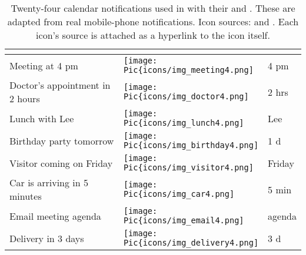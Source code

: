 \begin{table}[hptb]
  \centering
  \caption[Calendar notifications used in \studyone{}]{Twenty-four calendar notifications used in \studyone{} with their \textformat{} and \iconformat{}. These are adapted from real mobile-phone notifications. Icon sources: \materialIcons{}  and \flatIcons{}. Each icon's source is attached as a hyperlink to the icon itself.}
  \small
  \label{tab:IconNotif:study1:calendar_notification}
    \begin{tabular}{@{}p{5.5cm}p{1cm}p{1.8cm}@{}}
    \toprule
    \textformat{}                            & \multicolumn{2}{l}{\iconformat{}} \\ \midrule
    
    Meeting at 4 pm                 &   \texttt{[image: \\Pic\{icons/img\_meeting4.png]}}       & \hspace{1mm} 4 pm          \\    
    
    Doctor's appointment in 2 hours &  \texttt{[image: \\Pic\{icons/img\_doctor4.png]}}       & \hspace{1mm} 2 hrs         \\ 

    Lunch with Lee                 &   \texttt{[image: \\Pic\{icons/img\_lunch4.png]}}       & \hspace{1mm} Lee          \\  

    Birthday party tomorrow                 &   \texttt{[image: \\Pic\{icons/img\_birthday4.png]}}       & \hspace{1mm} 1 d          \\  

    Visitor coming on Friday                 &   \texttt{[image: \\Pic\{icons/img\_visitor4.png]}}       & \hspace{1mm} Friday          \\  

    Car is arriving in 5 minutes                 &   \texttt{[image: \\Pic\{icons/img\_car4.png]}}       & \hspace{1mm} 5 min          \\  

    Email meeting agenda                 &   \texttt{[image: \\Pic\{icons/img\_email4.png]}}       & \hspace{1mm} agenda          \\  

    Delivery in 3 days                 &   \texttt{[image: \\Pic\{icons/img\_delivery4.png]}}       & \hspace{1mm} 3 d          \\  


\end{tabular}
\end{table}

